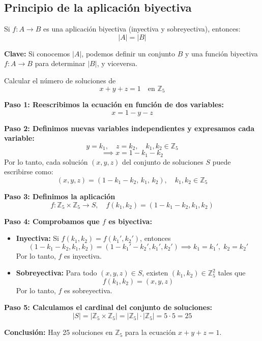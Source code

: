 \documentclass[a4paper,12pt]{article}
\begin{document}
\subsection{Principio de la aplicación biyectiva}

\begin{procedimiento}[title=Aplicación biyectiva]
Si $f: A \to B$ es una aplicación biyectiva (inyectiva y sobreyectiva), entonces:
\[
|A| = |B|
\]

\textbf{Clave:} Si conocemos $|A|$, podemos definir un conjunto $B$ y una función biyectiva $f: A \to B$ para determinar $|B|$, y viceversa.
\end{procedimiento}

\begin{ejemplo}[title=Ejemplo: Soluciones de una ecuación en $\mathbb{Z}_5$]
Calcular el número de soluciones de
\[
x + y + z = 1 \quad \text{en } \mathbb{Z}_5
\]

\textbf{Paso 1: Reescribimos la ecuación en función de dos variables:}
\[
x = 1 - y - z
\]

\textbf{Paso 2: Definimos nuevas variables independientes y expresamos cada variable:}
\[
y = k_1, \quad z = k_2, \quad k_1, k_2 \in \mathbb{Z}_5
\]
\[
\implies x = 1 - k_1 - k_2
\]
Por lo tanto, cada solución \((x,y,z)\) del conjunto de soluciones $S$ puede escribirse como:
\[
(x,y,z) = (1 - k_1 - k_2, \, k_1, \, k_2), \quad k_1, k_2 \in \mathbb{Z}_5
\]

\textbf{Paso 3: Definimos la aplicación}
\[
f: \mathbb{Z}_5 \times \mathbb{Z}_5 \to S, \quad f(k_1, k_2) = (1 - k_1 - k_2, k_1, k_2)
\]

\textbf{Paso 4: Comprobamos que $f$ es biyectiva:}
\begin{itemize}
    \item \textbf{Inyectiva:} Si $f(k_1, k_2) = f(k_1', k_2')$, entonces
    \[
    (1 - k_1 - k_2, k_1, k_2) = (1 - k_1' - k_2', k_1', k_2') \implies k_1 = k_1', \; k_2 = k_2'
    \]
    Por lo tanto, $f$ es inyectiva.
    
    \item \textbf{Sobreyectiva:} Para todo $(x,y,z) \in S$, existen $(k_1,k_2) \in \mathbb{Z}_5^2$ tales que
    \[
    f(k_1, k_2) = (x,y,z)
    \]
    Por lo tanto, $f$ es sobreyectiva.
\end{itemize}

\textbf{Paso 5: Calculamos el cardinal del conjunto de soluciones:}
\[
|S| = |\mathbb{Z}_5 \times \mathbb{Z}_5| = |\mathbb{Z}_5| \cdot |\mathbb{Z}_5| = 5 \cdot 5 = 25
\]

\textbf{Conclusión:} Hay 25 soluciones en $\mathbb{Z}_5$ para la ecuación $x + y + z = 1$.
\end{ejemplo}
\end{document}
